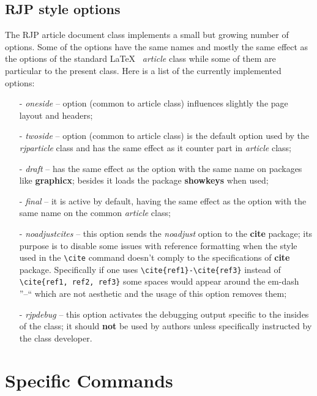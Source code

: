 \documentclass[myclassdoc,debug]{rjparticle}
\begin{document}
\subsection{RJP style options}

The RJP article document class implements a small but growing number of options. Some of the options have the same names and mostly
the same effect as the options of the standard \LaTeX~ \textit{article} class while some of them are particular to the present class. Here is a list of the currently implemented options:
\begin{enumerate}
\item[-] \textit{oneside} -- option (common to article class) influences slightly the page layout and headers;
\item[-] \textit{twoside} -- option (common to article class) is the default option used by the \textit{rjparticle} class and has the same effect as it counter part in \textit{article} class;
\item[-] \textit{draft} -- has the same effect as the option with the same name on packages like \textbf{graphicx}; besides it loads the package \textbf{showkeys} when used;
\item[-] \textit{final} -- it is active by default, having the same effect as the option with the same name on the common \textit{article} class;
\item[-] \textit{noadjustcites} -- this option sends the \textit{noadjust} option to the \textbf{cite} package; its purpose is to disable some issues with reference formatting when the style used in the \texttt{\small \textbackslash cite} command doesn't comply to the specifications of \textbf{cite} package. Specifically if one uses \texttt{\small \textbackslash cite\{ref1\}-\textbackslash cite\{ref3\}} instead of \texttt{\small \textbackslash cite\{ref1, ref2, ref3\}} some spaces would appear around the em-dash ''--`` which are not aesthetic and the usage of this option removes them;  
\item[-] \textit{rjpdebug} -- this option activates the debugging output specific to the insides of the class; it should \textbf{not} be used by authors unless specifically instructed by the class developer.
\end{enumerate}

\section{Specific Commands}
\end{document}
